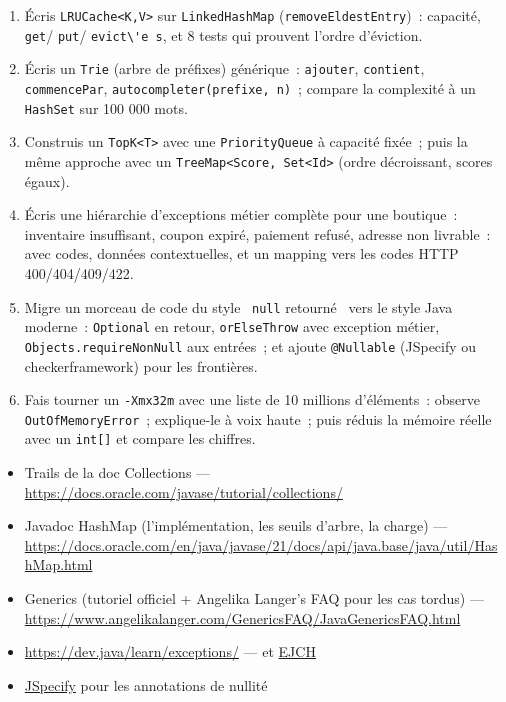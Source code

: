\documentclass[12pt,a4paper,twoside,openright]{book}
\newcommand{\link}[2]{\href{#2}{#1}}
\begin{document}
\begin{exercice}
\begin{enumerate}
  \item \'Ecris \verb|LRUCache<K,V>| sur \verb|LinkedHashMap| (\verb|removeEldestEntry|)~: capacit\'e,
        \verb|get|/ \verb|put|/ \verb|evict\'e s|, et 8 tests qui prouvent l'ordre d'\'eviction.
  \item \'Ecris un \verb|Trie| (arbre de pr\'efixes) g\'en\'erique~: \verb|ajouter|, \verb|contient|,
        \verb|commencePar|, \verb|autocompleter(prefixe, n)|~; compare la complexit\'e \`a un
        \verb|HashSet| sur 100 000 mots.
  \item Construis un \verb|TopK<T>| avec une \verb|PriorityQueue| \`a capacit\'e fix\'ee~; puis la
        m\^eme approche avec un \verb|TreeMap<Score, Set<Id>| (ordre d\'ecroissant, scores \'egaux).
  \item \'Ecris une hi\'erarchie d'exceptions m\'etier compl\`ete pour une boutique~: inventaire insuffisant,
        coupon expir\'e, paiement refus\'e, adresse non livrable~: avec codes, donn\'ees contextuelles,
        et un mapping vers les codes HTTP 400/404/409/422.
  \item Migre un morceau de code du style \og ~\verb|null| retourn\'e~ \fg{} vers le style Java moderne~:
        \verb|Optional| en retour, \verb|orElseThrow| avec exception m\'etier, \verb|Objects.requireNonNull|
        aux entr\'ees~; et ajoute \verb|@Nullable| (JSpecify ou checkerframework) pour les fronti\`eres.
  \item Fais tourner un \verb|-Xmx32m| avec une liste de 10 millions d'\'el\'ements~: observe
        \verb|OutOfMemoryError|~; explique-le \`a voix haute~; puis r\'eduis la m\'emoire r\'eelle avec un
        \verb|int[]| et compare les chiffres.
\end{enumerate}
\end{exercice}

\begin{ressources}
\begin{itemize}
  \item Trails de la doc Collections --- \url{https://docs.oracle.com/javase/tutorial/collections/}
  \item Javadoc HashMap (l'impl\'ementation, les seuils d'arbre, la charge) --- \url{https://docs.oracle.com/en/java/javase/21/docs/api/java.base/java/util/HashMap.html}
  \item Generics (tutoriel officiel + Angelika Langer's FAQ pour les cas tordus) --- \url{https://www.angelikalanger.com/GenericsFAQ/JavaGenericsFAQ.html}
  \item \url{https://dev.java/learn/exceptions/} --- et \link{EJCH}{https://www.oreilly.com/library/view/effective-java-3rd/}
  \item \link{JSpecify}{https://jspecify.dev/} pour les annotations de nullit\'e
\end{itemize}
\end{ressources}
\end{document}
